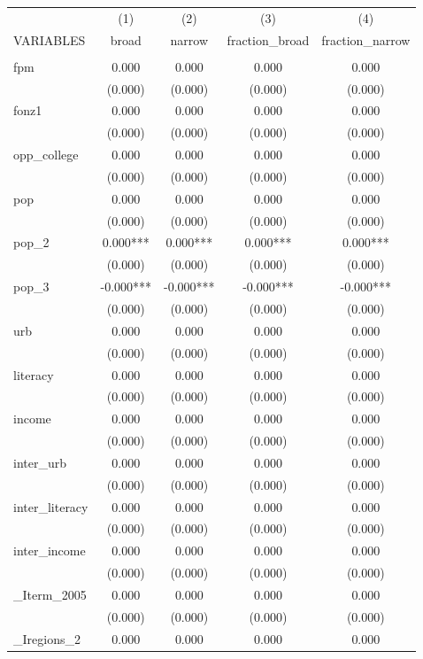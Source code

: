\documentclass[]{article}
\begin{document}
\begin{tabular}{lcccc} \hline
 & (1) & (2) & (3) & (4) \\
VARIABLES & broad & narrow & fraction\_broad & fraction\_narrow \\ \hline
 &  &  &  &  \\
fpm & 0.000 & 0.000 & 0.000 & 0.000 \\
 & (0.000) & (0.000) & (0.000) & (0.000) \\
fonz1 & 0.000 & 0.000 & 0.000 & 0.000 \\
 & (0.000) & (0.000) & (0.000) & (0.000) \\
opp\_college & 0.000 & 0.000 & 0.000 & 0.000 \\
 & (0.000) & (0.000) & (0.000) & (0.000) \\
pop & 0.000 & 0.000 & 0.000 & 0.000 \\
 & (0.000) & (0.000) & (0.000) & (0.000) \\
pop\_2 & 0.000*** & 0.000*** & 0.000*** & 0.000*** \\
 & (0.000) & (0.000) & (0.000) & (0.000) \\
pop\_3 & -0.000*** & -0.000*** & -0.000*** & -0.000*** \\
 & (0.000) & (0.000) & (0.000) & (0.000) \\
urb & 0.000 & 0.000 & 0.000 & 0.000 \\
 & (0.000) & (0.000) & (0.000) & (0.000) \\
literacy & 0.000 & 0.000 & 0.000 & 0.000 \\
 & (0.000) & (0.000) & (0.000) & (0.000) \\
income & 0.000 & 0.000 & 0.000 & 0.000 \\
 & (0.000) & (0.000) & (0.000) & (0.000) \\
inter\_urb & 0.000 & 0.000 & 0.000 & 0.000 \\
 & (0.000) & (0.000) & (0.000) & (0.000) \\
inter\_literacy & 0.000 & 0.000 & 0.000 & 0.000 \\
 & (0.000) & (0.000) & (0.000) & (0.000) \\
inter\_income & 0.000 & 0.000 & 0.000 & 0.000 \\
 & (0.000) & (0.000) & (0.000) & (0.000) \\
\_Iterm\_2005 & 0.000 & 0.000 & 0.000 & 0.000 \\
 & (0.000) & (0.000) & (0.000) & (0.000) \\
\_Iregions\_2 & 0.000 & 0.000 & 0.000 & 0.000 \\

\end{tabular}
\end{document}
